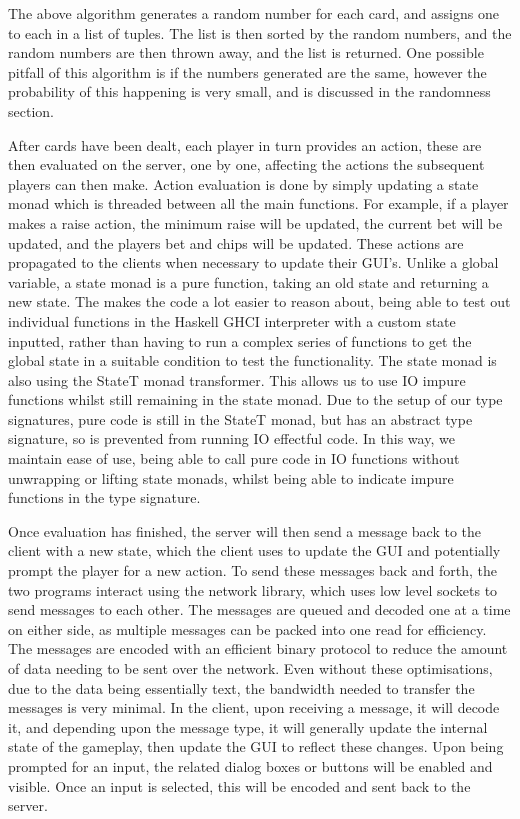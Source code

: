 \vspace{0.3cm}

The above algorithm generates a random number for each card, and assigns
one to each in a list of tuples. The list is then sorted by the random numbers,
and the random numbers are then thrown away, and the list is returned. One
possible pitfall of this algorithm is if the numbers generated are the same,
however the probability of this happening is very small, and is discussed
in the randomness section.

After cards have been dealt, each player in turn provides an action, these are
then evaluated on the server, one by one, affecting the actions the subsequent
players can then make. Action evaluation is done by simply updating a state 
monad which is threaded between all the main functions. For example, if a 
player makes a raise action, the minimum raise will be updated, the current bet 
will be updated, and the players bet and chips will be updated. These actions 
are propagated to the clients when necessary to update their GUI's. Unlike a 
global variable, a state monad is a pure function, taking an old state and 
returning a new state. The makes the code a lot easier to reason about, being 
able to test out individual functions in the Haskell GHCI interpreter with a 
custom state inputted, rather than having to run a complex series of functions 
to get the global state in a suitable condition to test the functionality. 
The state monad is also using the StateT monad transformer. This allows us to 
use IO impure functions whilst still remaining in the state monad. Due to the
setup of our type signatures, pure code is still in the StateT monad, but
has an abstract type signature, so is prevented from running IO effectful code.
In this way, we maintain ease of use, being able to call pure code in IO
functions without unwrapping or lifting state monads, whilst being able to
indicate impure functions in the type signature.

Once evaluation has finished, the server will then send a message back to the
client with a new state, which the client uses to update the GUI and
potentially prompt the player for a new action. To send these messages back
and forth, the two programs interact using the network library, which uses low 
level sockets to send messages to each other. The messages are queued and 
decoded one at a time on either side, as multiple messages can be packed into 
one read for efficiency. The messages are encoded with an efficient binary 
protocol to reduce the amount of data needing to be sent over the network. 
Even without these optimisations, due to the data being essentially text, the 
bandwidth needed to transfer the messages is very minimal. In the client, upon 
receiving a message, it will decode it, and depending upon the message type, 
it will generally update the internal state of the gameplay, then update the 
GUI to reflect these changes. Upon being prompted for an input, the related 
dialog boxes or buttons will be enabled and visible. Once an input is selected, 
this will be encoded and sent back to the server.

